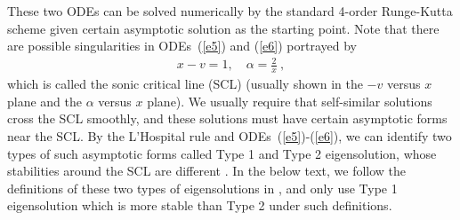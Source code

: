 \documentclass[fleqn,usenatbib]{mnras}
\begin{document}
These two ODEs can be solved numerically by the standard 4-order Runge-Kutta scheme given certain asymptotic solution as the starting point. Note that there are possible singularities in ODEs~(\ref{e5}) and (\ref{e6}) portrayed by 
\begin{gather}
x-v=1,\quad \alpha=\frac{2}{x}\ ,\label{e7}
\end{gather}
which is called the sonic critical line (SCL) (usually shown in the $-v$ versus $x$ plane and the $\alpha$ versus $x$ plane). We usually require that self-similar solutions cross the SCL smoothly, and these solutions must have certain asymptotic forms near the SCL. By the L'Hospital rule and ODEs~(\ref{e5})-(\ref{e6}), we can identify two types of such asymptotic forms called Type 1 and Type 2 eigensolution, whose stabilities around the SCL are different \citep{shu1977self,hunter1977collapse,whitworth1985self,lou2004envelope}. 
In the below text, we follow the definitions of these two types of eigensolutions in \citet{yuLou2005}, and only use Type 1 eigensolution which is more stable than Type 2 under such definitions. 
\end{document}
